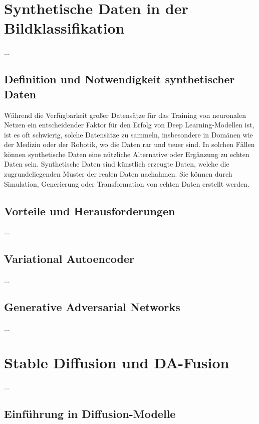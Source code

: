 \section{Synthetische Daten in der Bildklassifikation}

...

\subsection{Definition und Notwendigkeit synthetischer Daten}

Während die Verfügbarkeit großer Datensätze für das Training von neuronalen Netzen ein entscheidender Faktor für den Erfolg von Deep Learning-Modellen ist, ist es oft schwierig, solche Datensätze zu sammeln, insbesondere in Domänen wie der Medizin oder der Robotik, wo die Daten rar und teuer sind. In solchen Fällen können synthetische Daten eine nützliche Alternative oder Ergänzung zu echten Daten sein. Synthetische Daten sind künstlich erzeugte Daten, welche die zugrundeliegenden Muster der realen Daten nachahmen. Sie können durch Simulation, Generierung oder Transformation von echten Daten erstellt werden.

\subsection{Vorteile und Herausforderungen}

...

\subsection{Variational Autoencoder}

...

\subsection{Generative Adversarial Networks}

...

\section{Stable Diffusion und DA-Fusion}

...

\subsection{Einführung in Diffusion-Modelle}

